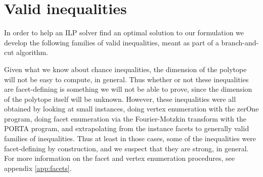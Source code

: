 \section{Valid inequalities}

In order to help an ILP solver find an optimal solution to our formulation we develop the following families of valid inequalities, meant as part of a branch-and-cut algorithm.

Given what we know about chance inequalities, the dimension of the polytope will not be easy to compute, in general. Thus whether or not these inequalities are facet-defining is something we will not be able to prove, since the dimension of the polytope itself will be unknown. However, these inequalities were all obtained by looking at small instances, doing vertex enumeration with the zerOne program\cite{Bussieck:1998:VSS:302316.302321}, doing facet enumeration via the Fourier-Motzkin transform with the PORTA program\cite{PORTA}, and extrapolating from the instance facets to generally valid families of inequalities. Thus at least in those cases, some of the inequalities were facet-defining by construction, and we suspect that they are strong, in general. For more information on the facet and vertex enumeration procedures, see appendix \ref{app:facets}.

%




